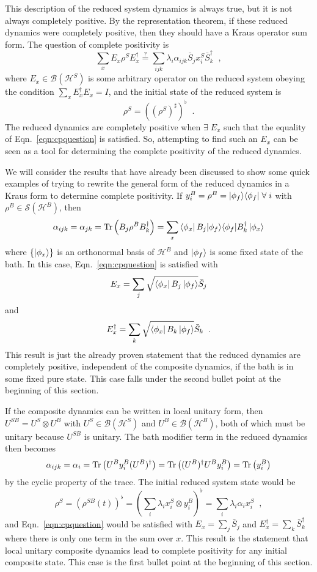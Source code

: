 This description of the reduced system dynamics is always true, but it is not always completely positive.  By the representation theorem, if these reduced dynamics were completely positive, then they should have a Kraus operator sum form.  The question of complete positivity is
\begin{equation}
\label{eqn:cpquestion}
\sum_x E_x \rho^S E_x^\dagger \overset{?}{=} \sum_{ijk} \lambda_i \alpha_{ijk} \bar{S}_j x_i^S \bar{S}_k^\dagger\;\;,
\end{equation}
where $E_x\in\mathcal{B}(\mathcal{H}^S)$ is some arbitrary operator on the reduced system obeying the condition $\sum_x E_x^\dagger E_x = I$, and the initial state of the reduced system is
\begin{equation}
\rho^S = \left(\left(\rho^{S}\right)^\sharp\right)^\flat \;\;.
\end{equation}
The reduced dynamics are completely positive when $\exists\;E_x$ such that the equality of Eqn.\ \ref{eqn:cpquestion} is satisfied.  So, attempting to find such an $E_x$ can be seen as a tool for determining the complete positivity of the reduced dynamics.

We will consider the results that have already been discussed to show some quick examples of trying to rewrite the general form of the reduced dynamics in a Kraus form to determine complete positivity.  If $y_i^B = \rho^B = |\phi_f\rangle\langle\phi_f|\;\forall\;i$ with $\rho^B\in\mathcal{S}(\mathcal{H}^B)$, then 
$$
\alpha_{ijk} = \alpha_{jk} = \operatorname{Tr}\left(B_j \rho^B B_k^\dagger\right) = \sum_x \left\langle\phi_x\right|B_j |\phi_f\rangle\langle\phi_f| B_k^\dagger\left|\phi_x\right\rangle
$$ 
where $\{\left|\phi_x\right\rangle\}$ is an orthonormal basis of $\mathcal{H}^B$ and $\left|\phi_f\right\rangle$ is some fixed state of the bath.  In this case, Eqn.\ \ref{eqn:cpquestion} is satisfied with 
$$
E_x = \sum_j \sqrt{\left\langle\phi_x\right|B_j \left|\phi_f\right\rangle} \bar{S}_j
$$
and
$$
E_x^\dagger = \sum_k \sqrt{\left\langle\phi_x\right|B_k \left|\phi_f\right\rangle} \bar{S}_k\;\;.
$$
This result is just the already proven statement that the reduced dynamics are completely positive, independent of the composite dynamics, if the bath is in some fixed pure state. This case falls under the second bullet point at the beginning of this section.

If the composite dynamics can be written in local unitary form, then $U^{SB} = U^S\otimes U^B$ with $U^S\in\mathcal{B}(\mathcal{H}^S)$ and $U^B\in\mathcal{B}(\mathcal{H}^B)$, both of which must be unitary because $U^{SB}$ is unitary.  The bath modifier term in the reduced dynamics then becomes
$$
\alpha_{ijk} = \alpha_{i} = \operatorname{Tr}\left(U^B y_i^B (U^B)^\dagger\right) = \operatorname{Tr}\left((U^B)^\dagger U^B y_i^B \right) = \operatorname{Tr}\left(y_i^B\right)
$$
by the cyclic property of the trace.  The initial reduced system state would be
$$
\rho^S = \left(\rho^{SB}(t)\right)^\flat = \left(\sum_i \lambda_i x_i^S \otimes y_i^B\right)^\flat = \sum_i \lambda_i \alpha_i x_i^S \;\;,
$$
and Eqn.\ \ref{eqn:cpquestion} would be satisfied with $E_x = \sum_j \bar{S}_j$ and $E_x^\dagger = \sum_k \bar{S}_k^\dagger$ where there is only one term in the sum over $x$.  This result is the statement that local unitary composite dynamics lead to complete positivity for any initial composite state.  This case is the first bullet point at the beginning of this section.

